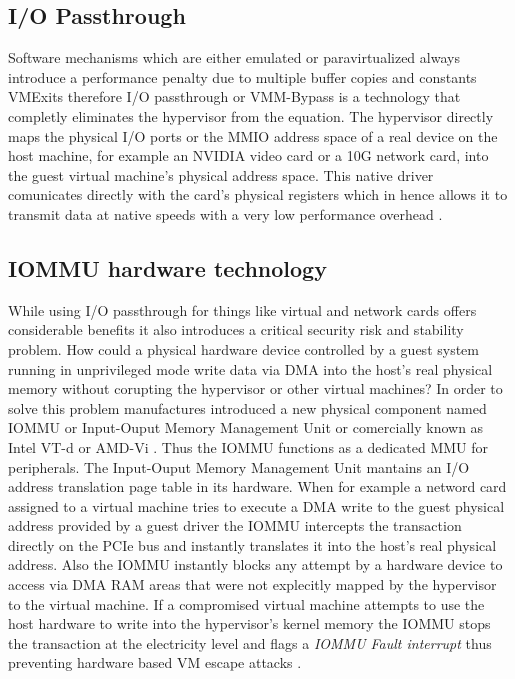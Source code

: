 \subsection{I/O Passthrough}
Software mechanisms which are either emulated or paravirtualized always introduce a performance penalty due to multiple buffer copies and constants VMExits therefore I/O passthrough or VMM-Bypass is a technology that completly eliminates the hypervisor from the equation. The hypervisor directly maps the physical I/O ports or the MMIO address space of a real device on the host machine, for example an NVIDIA video card or a 10G network card, into the guest virtual machine's physical address space. This native driver comunicates directly with the card's physical registers which in hence allows it to transmit data at native speeds with a very low performance overhead \cite{implementation-of-internetworking-with-host-internet-in-oracle-virtualbox-guest-virtual-machines.pdf}.

\subsection{IOMMU hardware technology}
While using I/O passthrough for things like virtual and network cards offers considerable benefits it also introduces a critical security risk and stability problem. How could a physical hardware device controlled by a guest system running in unprivileged mode write data via DMA into the host's real physical memory without corupting the hypervisor or other virtual machines? In order to solve this problem manufactures introduced a new physical component named IOMMU or Input-Ouput Memory Management Unit or comercially known as Intel VT-d or AMD-Vi \cite{vm-security.pdf}. Thus the IOMMU functions as a dedicated MMU for peripherals. The Input-Ouput Memory Management Unit mantains an I/O address translation page table in its hardware. When for example a netword card assigned to a virtual machine tries to execute a DMA write to the guest physical address provided by a guest driver the IOMMU intercepts the transaction directly on the PCIe bus and instantly translates it into the host's real physical address. Also the IOMMU instantly blocks any attempt by a hardware device to access via DMA RAM areas that were not explecitly mapped by the hypervisor to the virtual machine. If a compromised virtual machine attempts to use the host hardware to write into the hypervisor's kernel memory the IOMMU stops the transaction at the electricity level and flags a \emph{IOMMU Fault interrupt} thus preventing hardware based VM escape attacks \cite{vm-security.pdf}.